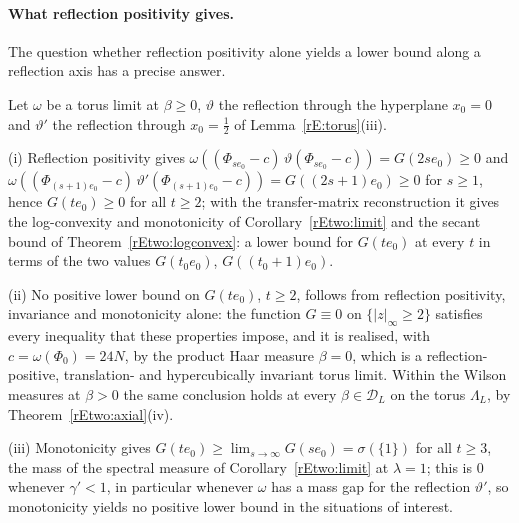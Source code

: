 \paragraph{What reflection positivity gives.} The question whether
reflection positivity alone yields a lower bound along a reflection axis
has a precise answer.

\begin{proposition}
\label{rEtwo:rp}
Let $\omega$ be a torus limit at $\beta\ge0$, $\vartheta$ the reflection
through the hyperplane $x_0=0$ and $\vartheta'$ the reflection through
$x_0=\tfrac12$ of Lemma~\textup{\ref{rE:torus}(iii)}.

\textup{(i)} Reflection positivity gives $\omega((\Phi_{se_0}-c)\,
\vartheta(\Phi_{se_0}-c))=G(2se_0)\ge0$ and $\omega((\Phi_{(s+1)e_0}-c)\,
\vartheta'(\Phi_{(s+1)e_0}-c))=G((2s+1)e_0)\ge0$ for $s\ge1$, hence
$G(te_0)\ge0$ for all $t\ge2$; with the transfer-matrix reconstruction it
gives the log-convexity and monotonicity of Corollary~\ref{rEtwo:limit}
and the secant bound of Theorem~\ref{rEtwo:logconvex}: a lower bound for
$G(te_0)$ at every $t$ in terms of the two values $G(t_0e_0)$, $G((t_0+1)
e_0)$.

\textup{(ii)} No positive lower bound on $G(te_0)$, $t\ge2$, follows from
reflection positivity, invariance and monotonicity alone: the function
$G\equiv0$ on $\{|z|_\infty\ge2\}$ satisfies every inequality that these
properties impose, and it is realised, with $c=\omega(\Phi_0)=24N$, by the
product Haar measure $\beta=0$, which is a reflection-positive, translation-
and hypercubically invariant torus limit. Within the Wilson measures at
$\beta>0$ the same conclusion holds at every $\beta\in\mathcal D_L$ on the
torus $\Lambda_L$, by Theorem~\textup{\ref{rEtwo:axial}(iv)}.

\textup{(iii)} Monotonicity gives $G(te_0)\ge\lim_{s\to\infty}G(se_0)=
\sigma(\{1\})$ for all $t\ge3$, the mass of the spectral measure of
Corollary~\ref{rEtwo:limit} at $\lambda=1$; this is $0$ whenever
$\gamma'<1$, in particular whenever $\omega$ has a mass gap for the
reflection $\vartheta'$, so monotonicity yields no positive lower bound in
the situations of interest.
\end{proposition}

